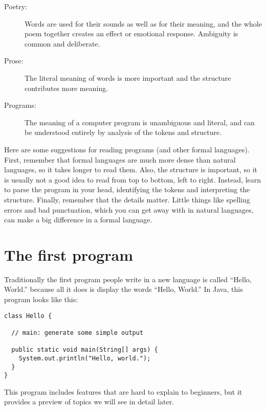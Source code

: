 \documentclass[12pt]{book}
\theoremstyle{definition}
\begin{document}

\begin{description}

\item[Poetry:] Words are used for their sounds as well as for
their meaning, and the whole poem together creates an effect or
emotional response.  Ambiguity is common and deliberate.

\item[Prose:] The literal meaning of words is more important
and the structure contributes more meaning.

\item[Programs:] The meaning of a computer program is unambiguous
and literal, and can be understood entirely by analysis of the
tokens and structure.

\end{description}

Here are some suggestions for reading programs (and other formal
languages).  First, remember that formal languages are much more dense
than natural languages, so it takes longer to read them.  Also, the
structure is important, so it is usually not a good idea to read
from top to bottom, left to right.  Instead, learn to parse the
program in your head, identifying the tokens and interpreting the
structure.  Finally, remember that the details matter.  Little things
like spelling errors and bad punctuation, which you can get away
with in natural languages, can make a big difference in a formal
language.

\section{The first program}
\label{hello}

Traditionally the first program people write in a new language
is called ``Hello, World.'' because all it does is display the
words ``Hello, World.''  In Java, this program looks like this:

\begin{lstlisting}
class Hello {

  // main: generate some simple output

  public static void main(String[] args) {
    System.out.println("Hello, world.");
  }
}
\end{lstlisting}
%
This program includes features that are hard to explain to
beginners, but it provides a preview of topics we
will see in detail later.
\end{document}
